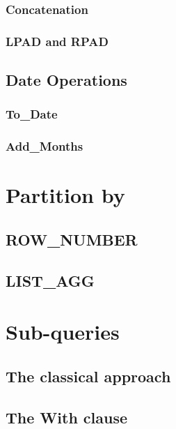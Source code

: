 \documentclass[12pt, letterpaper]{report}
\begin{document}
\subsection{Concatenation}
\subsection{LPAD and RPAD}

\section{Date Operations}
\blindtext

\subsection{To\_Date}
\subsection{Add\_Months}

\chapter{Partition by}
\blindtext

\section{ROW\_NUMBER}
\blindtext

\section{LIST\_AGG}
\blindtext

\chapter{Sub-queries}
\blindtext

\section{The classical approach}

\section{The With clause}

\end{document}
